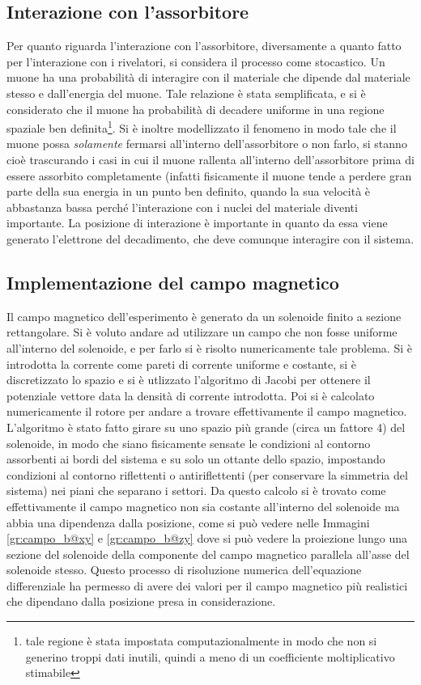 \subsection{Interazione con l'assorbitore}
Per quanto riguarda l'interazione con l'assorbitore, diversamente a quanto fatto per l'interazione con i rivelatori, si considera il processo come stocastico. Un muone
ha una probabilità di interagire con il materiale che dipende dal materiale stesso e dall'energia del muone. Tale relazione è stata semplificata, e si è considerato che il
muone ha probabilità di decadere uniforme in una regione spaziale ben definita\footnote{tale regione è stata impostata computazionalmente in modo che non si generino troppi
dati inutili, quindi a meno di un coefficiente moltiplicativo stimabile}. Si è inoltre modellizzato il fenomeno in modo tale che il muone possa \textit{solamente} fermarsi all'interno dell'assorbitore o non farlo, si stanno cioè trascurando i casi in cui il muone rallenta all'interno dell'assorbitore prima di essere assorbito completamente (infatti fisicamente il muone tende a perdere gran parte della sua energia in un punto ben definito, quando la sua velocit\`a \`e abbastanza bassa perch\'e l'interazione con i nuclei del materiale diventi importante. La posizione di interazione \`e importante in quanto da essa viene generato l'elettrone del decadimento, che deve comunque interagire con il sistema.

\subsection{Implementazione del campo magnetico}
Il campo magnetico dell'esperimento è generato da un solenoide finito a sezione rettangolare. Si è voluto andare ad utilizzare un campo che non fosse uniforme all'interno
del solenoide, e per farlo si è risolto numericamente tale problema. Si è introdotta la corrente come pareti di corrente uniforme e costante, si è discretizzato lo spazio
e si è utlizzato l'algoritmo di Jacobi per ottenere il potenziale vettore data la densità di corrente introdotta. Poi si è calcolato numericamente il rotore per
andare a trovare effettivamente il campo magnetico. L'algoritmo è stato fatto girare su uno spazio più grande (circa un fattore 4) del solenoide, in modo che siano
fisicamente sensate le condizioni al contorno assorbenti ai bordi del sistema e su solo un ottante dello spazio, impostando condizioni al contorno riflettenti o antiriflettenti (per conservare la simmetria del sistema) nei piani che separano i settori. Da questo calcolo si è trovato come effettivamente il campo magnetico non sia costante
all'interno del solenoide ma abbia una dipendenza dalla posizione, come si può vedere nelle Immagini \ref{gr:campo_b@xy} e \ref{gr:campo_b@zy} dove si può vedere la proiezione lungo una
sezione del solenoide della componente del campo magnetico parallela all'asse del solenoide stesso. Questo processo di risoluzione numerica dell'equazione differenziale
ha permesso di avere dei valori per il campo magnetico più realistici che dipendano dalla posizione presa in considerazione.

